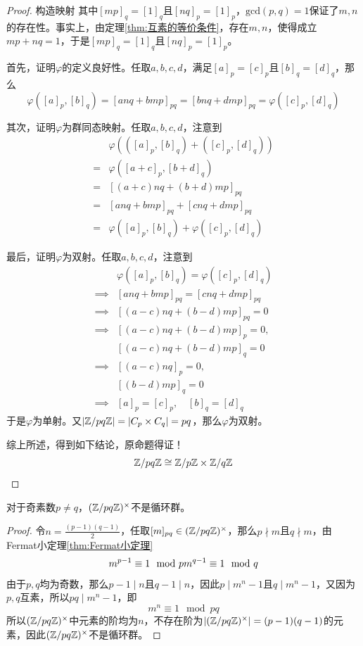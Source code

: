 \begin{proof}
	构造映射
	其中$[mp]_{q}=[1]_q$且$[nq]_{p}=[1]_p$，$\mathrm{gcd}(p,q)=1$保证了$m,n$的存在性。事实上，由定理\ref{thm:互素的等价条件}，存在$m,n$，使得成立$mp+nq=1$，于是$[mp]_{q}=[1]_q$且$[nq]_{p}=[1]_p$。
	
	首先，证明$\varphi$的定义良好性。任取$a,b,c,d$，满足$[a]_p=[c]_p$且$[b]_q=[d]_q$，那么
	$$
	\varphi([a]_p,[b]_q)=[anq+bmp]_{pq}=[bnq+dmp]_{pq}=\varphi([c]_p,[d]_q)
	$$
	
	其次，证明$\varphi$为群同态映射。任取$a,b,c,d$，注意到
	\begin{align*}
		& \varphi(([a]_p,[b]_q)+([c]_p,[d]_q))\\
		=& \varphi([a+c]_p,[b+d]_q)\\
		=& [(a+c)nq+(b+d)mp]_{pq}\\
		=& [anq+bmp]_{pq}+[cnq+dmp]_{pq}\\
		=& \varphi([a]_p,[b]_q)+\varphi([c]_p,[d]_q)
	\end{align*}
	
	最后，证明$\varphi$为双射。任取$a,b,c,d$，注意到
	\begin{align*}
		& \varphi([a]_p,[b]_q)=\varphi([c]_p,[d]_q)\\
		\implies & [anq+bmp]_{pq}=[cnq+dmp]_{pq}\\
		\implies & [(a-c)nq+(b-d)mp]_{pq}=0\\
		\implies & [(a-c)nq+(b-d)mp]_{p}=0,\\
		& [(a-c)nq+(b-d)mp]_{q}=0\\
		\implies & [(a-c)nq]_{p}=0,\\
		& [(b-d)mp]_{q}=0\\
		\implies & [a]_p=[c]_p,\quad [b]_q=[d]_q
	\end{align*}
	于是$\varphi$为单射。又$|\mathbb{Z}/pq\mathbb{Z}|=|C_{p}\times C_{q}|=pq$，那么$\varphi$为双射。
	
	综上所述，得到如下结论，原命题得证！
	$$
	\mathbb{Z}/pq\mathbb{Z}\cong \mathbb{Z}/p\mathbb{Z}\times \mathbb{Z}/q\mathbb{Z}
	$$
\end{proof}

\begin{proposition}
	对于奇素数$p\ne q$，$(\mathbb{Z}/pq\mathbb{Z})^{\times}$不是循环群。
\end{proposition}

\begin{proof}
	令$n=\frac{(p-1)(q-1)}{2}$，任取$[m]_{pq}\in(\mathbb{Z}/pq\mathbb{Z})^{\times}$，那么$p\nmid m$且$q\nmid m$，由Fermat小定理\ref{thm:Fermat小定理}
	$$
	m^{p-1}\equiv  1 \mod p\\
	m^{q-1}\equiv  1 \mod q
	$$
	由于$p,q$均为奇数，那么$p-1\mid n$且$q-1\mid n$，因此$p\mid m^n-1$且$q\mid m^n-1$，又因为$p,q$互素，所以$pq\mid m^n-1$，即
	$$
	m^n\equiv 1\mod pq
	$$
	所以$(\mathbb{Z}/pq\mathbb{Z})^{\times}$中元素的阶均为$n$，不存在阶为$|(\mathbb{Z}/pq\mathbb{Z})^{\times}|=(p-1)(q-1)$的元素，因此$(\mathbb{Z}/pq\mathbb{Z})^{\times}$不是循环群。
\end{proof}

